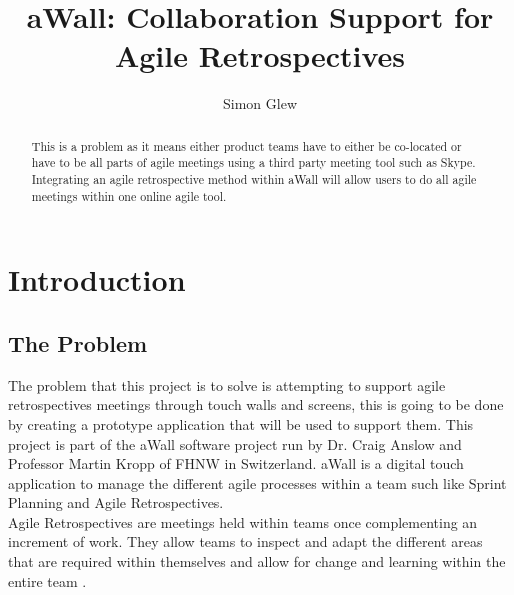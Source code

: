 \documentclass[11pt
              , a4paper
              , twoside
              , openright
              ]{report}
\title{aWall: Collaboration Support for Agile Retrospectives}
\author{Simon Glew}
\date{}
\begin{document}
\frontmatter



\begin{abstract}

This is a problem as it means either product teams have to either be co-located or have to be all parts of agile meetings using a third party meeting tool such as Skype. 
Integrating an agile retrospective method within aWall will allow users to do all agile meetings within one online agile tool.  

\end{abstract}


\maketitle


\mainmatter


\chapter{Introduction}\label{C:intro}
\section{The Problem} 
The problem that this project is to solve is attempting to support agile retrospectives meetings through touch walls and screens, this is going to be done by creating a prototype application that will be used to support them. This project is part of the aWall software project run by Dr. Craig Anslow and Professor Martin Kropp of FHNW in Switzerland. aWall is a digital touch application to manage the different agile processes within a team such like Sprint Planning and Agile Retrospectives.\\
Agile Retrospectives are meetings held within teams once complementing an increment of work. They allow teams to inspect and adapt the different areas that are required within themselves and allow for change and learning within the entire team \cite{AgileRetrospectivesEstherDerby}.
\end{document}
